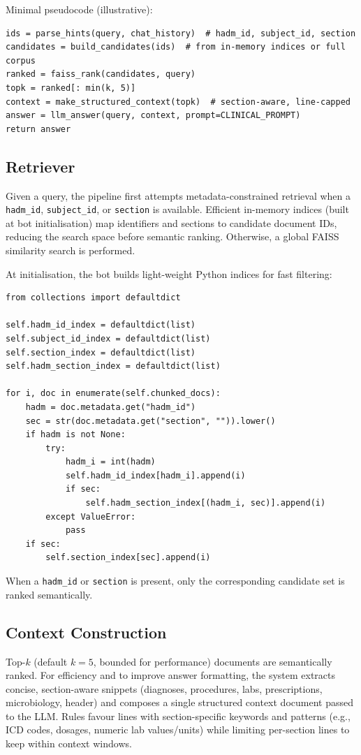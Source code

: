 \noindent Minimal pseudocode (illustrative):
\begin{verbatim}
ids = parse_hints(query, chat_history)  # hadm_id, subject_id, section
candidates = build_candidates(ids)  # from in-memory indices or full corpus
ranked = faiss_rank(candidates, query)
topk = ranked[: min(k, 5)]
context = make_structured_context(topk)  # section-aware, line-capped
answer = llm_answer(query, context, prompt=CLINICAL_PROMPT)
return answer
\end{verbatim}

\subsection{Retriever}
Given a query, the pipeline first attempts metadata-constrained retrieval when a \texttt{hadm\_id}, \texttt{subject\_id}, or \texttt{section} is available. Efficient in-memory indices (built at bot initialisation) map identifiers and sections to candidate document IDs, reducing the search space before semantic ranking. Otherwise, a global FAISS similarity search is performed.

\vspace{0.5em}
\noindent At initialisation, the bot builds light-weight Python indices for fast filtering:
\begin{verbatim}
from collections import defaultdict

self.hadm_id_index = defaultdict(list)
self.subject_id_index = defaultdict(list)
self.section_index = defaultdict(list)
self.hadm_section_index = defaultdict(list)

for i, doc in enumerate(self.chunked_docs):
    hadm = doc.metadata.get("hadm_id")
    sec = str(doc.metadata.get("section", "")).lower()
    if hadm is not None:
        try:
            hadm_i = int(hadm)
            self.hadm_id_index[hadm_i].append(i)
            if sec:
                self.hadm_section_index[(hadm_i, sec)].append(i)
        except ValueError:
            pass
    if sec:
        self.section_index[sec].append(i)
\end{verbatim}

\noindent When a \texttt{hadm\_id} or \texttt{section} is present, only the corresponding candidate set is ranked semantically.

\subsection{Context Construction}
Top-$k$ (default \(k=5\), bounded for performance) documents are semantically ranked. For efficiency and to improve answer formatting, the system extracts concise, section-aware snippets (diagnoses, procedures, labs, prescriptions, microbiology, header) and composes a single structured context document passed to the LLM. Rules favour lines with section-specific keywords and patterns (e.g., ICD codes, dosages, numeric lab values/units) while limiting per-section lines to keep within context windows.

